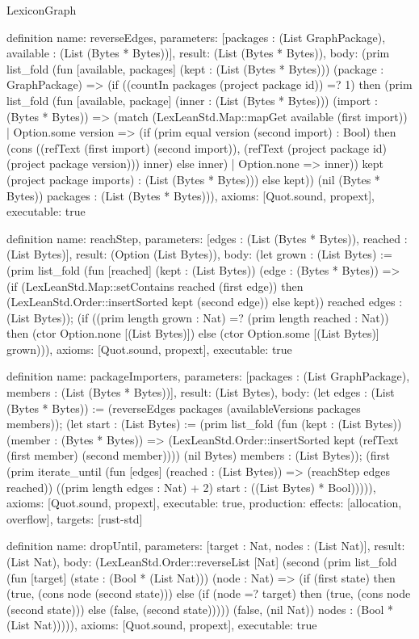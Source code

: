 \begin{lexlean}{LexiconGraph}
\begin{semanticmodule}
definition{
  name: reverseEdges,
  parameters: [packages : (List GraphPackage), available : (List (Bytes * Bytes))],
  result: (List (Bytes * Bytes)),
  body: (prim list_fold (fun [available, packages] (kept : (List (Bytes * Bytes))) (package : GraphPackage) => (if ((countIn packages (project package id)) =? 1) then (prim list_fold (fun [available, package] (inner : (List (Bytes * Bytes))) (import : (Bytes * Bytes)) => (match (LexLeanStd.Map::mapGet available (first import))
    | Option.some version => (if (prim equal version (second import) : Bool) then (cons ((refText (first import) (second import)), (refText (project package id) (project package version))) inner) else inner)
    | Option.none => inner)) kept (project package imports) : (List (Bytes * Bytes))) else kept)) (nil (Bytes * Bytes)) packages : (List (Bytes * Bytes))),
  axioms: [Quot.sound, propext],
  executable: true
}

definition{
  name: reachStep,
  parameters: [edges : (List (Bytes * Bytes)), reached : (List Bytes)],
  result: (Option (List Bytes)),
  body: (let grown : (List Bytes) := (prim list_fold (fun [reached] (kept : (List Bytes)) (edge : (Bytes * Bytes)) => (if (LexLeanStd.Map::setContains reached (first edge)) then (LexLeanStd.Order::insertSorted kept (second edge)) else kept)) reached edges : (List Bytes)); (if ((prim length grown : Nat) =? (prim length reached : Nat)) then (ctor Option.none [(List Bytes)]) else (ctor Option.some [(List Bytes)] grown))),
  axioms: [Quot.sound, propext],
  executable: true
}

definition{
  name: packageImporters,
  parameters: [packages : (List GraphPackage), members : (List (Bytes * Bytes))],
  result: (List Bytes),
  body: (let edges : (List (Bytes * Bytes)) := (reverseEdges packages (availableVersions packages members)); (let start : (List Bytes) := (prim list_fold (fun (kept : (List Bytes)) (member : (Bytes * Bytes)) => (LexLeanStd.Order::insertSorted kept (refText (first member) (second member)))) (nil Bytes) members : (List Bytes)); (first (prim iterate_until (fun [edges] (reached : (List Bytes)) => (reachStep edges reached)) ((prim length edges : Nat) + 2) start : ((List Bytes) * Bool))))),
  axioms: [Quot.sound, propext],
  executable: true,
  production: {effects: [allocation, overflow], targets: [rust-std]}
}

definition{
  name: dropUntil,
  parameters: [target : Nat, nodes : (List Nat)],
  result: (List Nat),
  body: (LexLeanStd.Order::reverseList [Nat] (second (prim list_fold (fun [target] (state : (Bool * (List Nat))) (node : Nat) => (if (first state) then (true, (cons node (second state))) else (if (node =? target) then (true, (cons node (second state))) else (false, (second state))))) (false, (nil Nat)) nodes : (Bool * (List Nat))))),
  axioms: [Quot.sound, propext],
  executable: true
}


\end{semanticmodule}
\end{lexlean}
